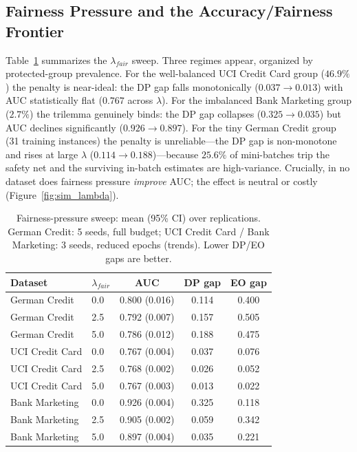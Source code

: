 \documentclass{wscpaperproc}
\theoremstyle{wsc}
\begin{document}
\subsection{Fairness Pressure and the Accuracy/Fairness Frontier}
Table~\ref{tab:lambda_sweep} summarizes the $\lambda_{fair}$ sweep. Three regimes appear, organized by protected-group prevalence. For the well-balanced UCI Credit Card group ($46.9\%$) the penalty is near-ideal: the DP gap falls monotonically ($0.037\!\to\!0.013$) with AUC statistically flat ($0.767$ across $\lambda$). For the imbalanced Bank Marketing group ($2.7\%$) the trilemma genuinely binds: the DP gap collapses ($0.325\!\to\!0.035$) but AUC declines significantly ($0.926\!\to\!0.897$). For the tiny German Credit group (31 training instances) the penalty is unreliable---the DP gap is non-monotone and rises at large $\lambda$ ($0.114\!\to\!0.188$)---because $25.6\%$ of mini-batches trip the safety net and the surviving in-batch estimates are high-variance. Crucially, in no dataset does fairness pressure \emph{improve} AUC; the effect is neutral or costly (Figure~\ref{fig:sim_lambda}).

\begin{table}[htb]
\centering
\caption{Fairness-pressure sweep: mean (95\% CI) over replications. German Credit: 5 seeds, full budget; UCI Credit Card / Bank Marketing: 3 seeds, reduced epochs (trends). Lower DP/EO gaps are better.}
\label{tab:lambda_sweep}
\footnotesize
\begin{tabular}{llccc}
\hline
Dataset & $\lambda_{fair}$ & AUC & DP gap & EO gap \\ \hline
German Credit    & 0.0 & 0.800 (0.016) & 0.114 & 0.400 \\
German Credit    & 2.5 & 0.792 (0.007) & 0.157 & 0.505 \\
German Credit    & 5.0 & 0.786 (0.012) & 0.188 & 0.475 \\ \hline
UCI Credit Card  & 0.0 & 0.767 (0.004) & 0.037 & 0.076 \\
UCI Credit Card  & 2.5 & 0.768 (0.002) & 0.026 & 0.052 \\
UCI Credit Card  & 5.0 & 0.767 (0.003) & 0.013 & 0.022 \\ \hline
Bank Marketing   & 0.0 & 0.926 (0.004) & 0.325 & 0.118 \\
Bank Marketing   & 2.5 & 0.905 (0.002) & 0.059 & 0.342 \\
Bank Marketing   & 5.0 & 0.897 (0.004) & 0.035 & 0.221 \\ \hline
\end{tabular}
\end{table}
\end{document}
